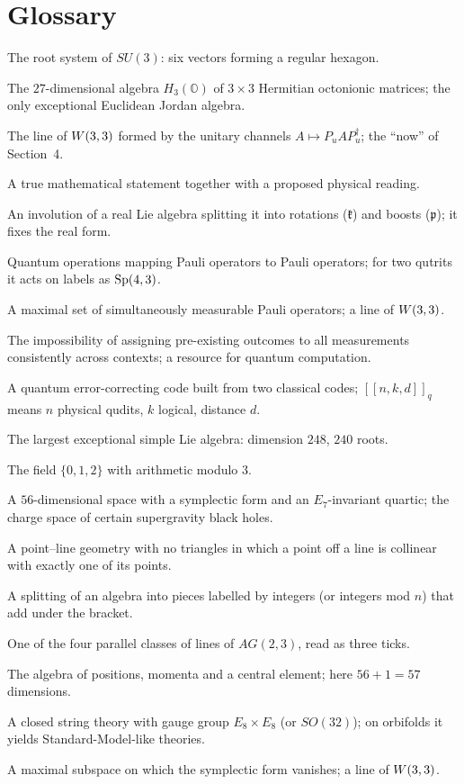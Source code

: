 \section{Glossary}
\label{app:glossary}

\newcommand{\gl}[2]{\item[\textsf{\textbf{#1}}] #2}
\begin{description}[leftmargin=0pt,labelsep=0.6em,itemsep=3pt,font=\normalfont]
\gl{$A_2$}{The root system of $SU(3)$: six vectors forming a regular hexagon.}
\gl{Albert algebra}{The $27$-dimensional algebra $H_3(\mathbb O)$ of $3\times3$ Hermitian
  octonionic matrices; the only exceptional Euclidean Jordan algebra.}
\gl{Bell line}{The line of $W(3,3)$ formed by the unitary channels $A\mapsto P_uAP_u^\dagger$;
  the ``now'' of Section~4.}
\gl{Bridge}{A true mathematical statement together with a proposed physical reading.}
\gl{Cartan involution}{An involution of a real Lie algebra splitting it into rotations
  ($\mathfrak k$) and boosts ($\mathfrak p$); it fixes the real form.}
\gl{Clifford group}{Quantum operations mapping Pauli operators to Pauli operators; for two
  qutrits it acts on labels as $\mathrm{Sp}(4,3)$.}
\gl{Context}{A maximal set of simultaneously measurable Pauli operators; a line of $W(3,3)$.}
\gl{Contextuality}{The impossibility of assigning pre-existing outcomes to all measurements
  consistently across contexts; a resource for quantum computation.}
\gl{CSS code}{A quantum error-correcting code built from two classical codes; $[[n,k,d]]_q$
  means $n$ physical qudits, $k$ logical, distance $d$.}
\gl{$E_8$}{The largest exceptional simple Lie algebra: dimension $248$, $240$ roots.}
\gl{$\F_3$}{The field $\{0,1,2\}$ with arithmetic modulo $3$.}
\gl{Freudenthal triple system}{A $56$-dimensional space with a symplectic form and an
  $E_7$-invariant quartic; the charge space of certain supergravity black holes.}
\gl{Generalized quadrangle}{A point--line geometry with no triangles in which a point off a
  line is collinear with exactly one of its points.}
\gl{Grading}{A splitting of an algebra into pieces labelled by integers (or integers mod
  $n$) that add under the bracket.}
\gl{Hesse clock}{One of the four parallel classes of lines of $AG(2,3)$, read as three ticks.}
\gl{Heisenberg algebra}{The algebra of positions, momenta and a central element; here
  $56+1=57$ dimensions.}
\gl{Heterotic string}{A closed string theory with gauge group $E_8\times E_8$ (or
  $SO(32)$); on orbifolds it yields Standard-Model-like theories.}
\gl{Lagrangian}{A maximal subspace on which the symplectic form vanishes; a line of $W(3,3)$.}

\end{description}
